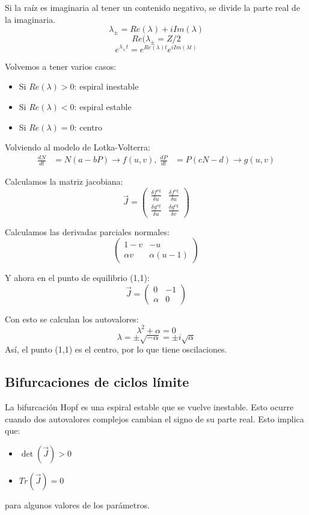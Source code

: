 Si la raíz es imaginaria al tener un contenido negativo, se divide la parte real de la imaginaria. 
$$\lambda_{\pm} = Re(\lambda) + iIm(\lambda)$$
$$Re(\lambda_{\pm} = Z/2$$
$$e^{\lambda_{\pm} t} = e^{Re(\lambda) t} e^{i Im(\lambda t)}$$

Volvemos a tener varios casos:
\begin{itemize}
\item Si $Re (\lambda) > 0$: espiral inestable
\item Si $Re(\lambda) < 0$: espiral estable
\item Si $Re(\lambda) = 0$: centro
\end{itemize}

Volviendo al modelo de Lotka-Volterra:
\begin{align*}
\frac{dN}{dt} &= N(a - bP) \rightarrow f(u,v), \
\frac{dP}{dt} &= P(cN - d) \rightarrow g(u, v)
\end{align*}

Calculamos la matriz jacobiana:
$$\vec{J} = \begin{pmatrix}
\frac{\delta f^{eq}}{\delta u} & \frac{\delta f^{eq}}{\delta u} \\
\frac{\delta g^{eq}}{\delta u} & \frac{\delta g^{eq}}{\delta v}
\end{pmatrix}$$

Calculamos las derivadas parciales normales:
$$ \begin{pmatrix}
1 - v & -u \\
\alpha v & \alpha(u - 1)
\end{pmatrix} $$

Y ahora en el punto de equilibrio (1,1):
$$\vec{J} = \begin{pmatrix}
0 & -1 \\ \alpha & 0
\end{pmatrix}$$

Con esto se calculan los autovalores:
$$\lambda^2 + \alpha = 0$$
$$\lambda = \pm \sqrt{- \alpha} = \pm i\sqrt{\alpha}$$
Así, el punto (1,1) es el centro, por lo que tiene oscilaciones.

\subsection{Bifurcaciones de ciclos límite}
La bifurcación Hopf es una espiral estable que se vuelve inestable. Esto ocurre cuando dos autovalores complejos cambian el signo de su parte real. Esto implica que:
\begin{itemize}
\item $\det (\vec{J}) > 0$
\item $Tr(\vec{J}) = 0$
\end{itemize}
para algunos valores de los parámetros.